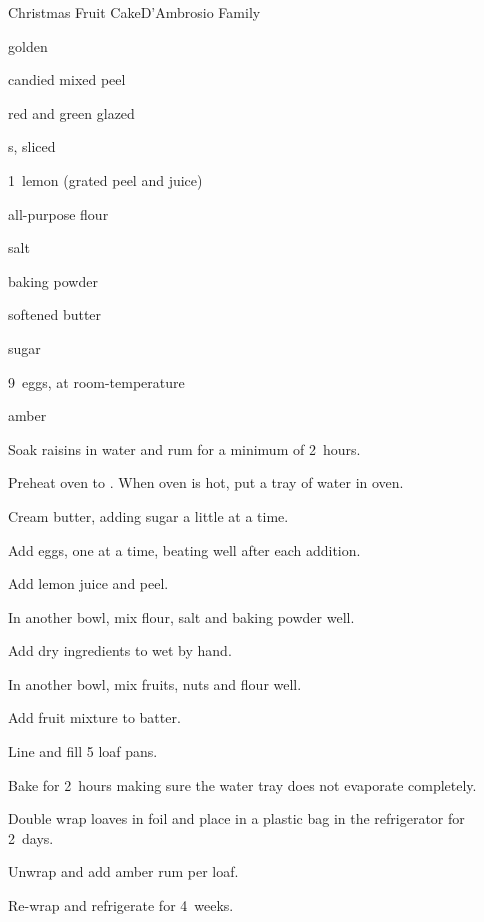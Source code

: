 \begin{recipe}{Christmas Fruit Cake}{D'Ambrosio Family}{}

\begin{ingredients}
\item {} golden 
\item {} candied mixed peel
\item \C{1\half} red and green glazed 
\item {} s, sliced 
\item 1~lemon (grated peel and juice)
\item \C{4\half} all-purpose flour
\item {} salt
\item {} baking powder
\item {} softened butter
\item {} sugar
\item 9~eggs, at room-temperature 
\item amber 
\end{ingredients}

\begin{directions}
\item Soak raisins in water and rum for a minimum of 2~hours.
\item Preheat oven to . When oven is hot, put a tray of water in oven.
\item Cream butter, adding sugar a little at a time.
\item Add eggs, one at a time, beating well after each addition.
\item Add lemon juice and peel.
\item In another bowl, mix  flour, salt and baking powder well.
\item Add dry ingredients to wet by hand.
\item In another bowl, mix fruits, nuts and \C{\half} flour well.
\item Add fruit mixture to batter.
\item Line and fill 5 loaf pans.
\item Bake for 2~hours making sure the water tray does not evaporate completely.
\item Double wrap loaves in foil and place in a plastic bag in the refrigerator for 2~days.
\item Unwrap and add \C{\third} amber rum per loaf.
\item Re-wrap and refrigerate for 4~weeks.
\end{directions}
\end{recipe}
